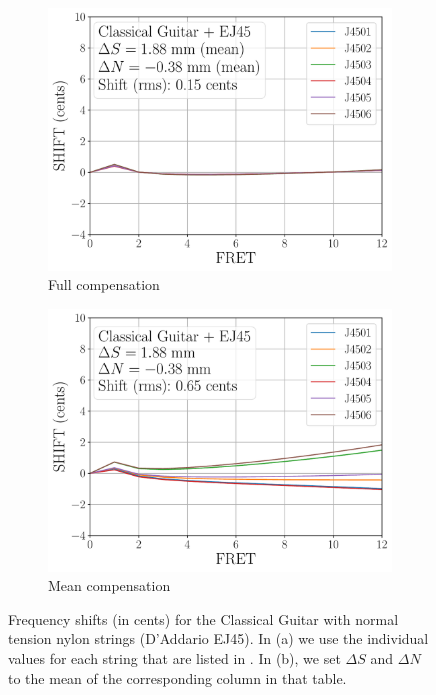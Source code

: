  \begin{figure}
  \centering
  \begin{subfigure}[b]{0.8\textwidth}
   \centering
   \includegraphics[width=5.0in]{figures/shift_classicalguitar_ej45_full}
   \caption{Full compensation}
   \label{fig:shift_classicalguitar_ej45_full}
  \end{subfigure}
  \par\vspace{0.25in}
  \begin{subfigure}[b]{0.8\textwidth}
   \centering
   \includegraphics[width=5.0in]{figures/shift_classicalguitar_ej45_mean}
   \caption{Mean compensation}
   \label{fig:shift_classicalguitar_ej45_mean}
  \end{subfigure}
  \caption{\label{fig:compensation_classicalguitar_ej45} Frequency shifts (in cents) for the Classical Guitar with normal tension nylon strings (D'Addario EJ45). In (a) we use the individual values for each string that are listed in . In (b), we set $\Delta S$ and $\Delta N$ to the mean of the corresponding column in that table.}
 \end{figure}

